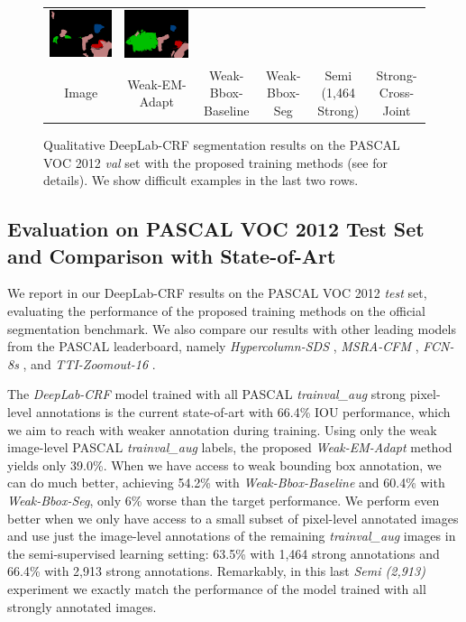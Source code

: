 \begin{figure}[!htbp]
{\begin{tabular}{c c c c c c}
    \includegraphics[height=0.11\linewidth]{fig/val_crf_vis/strongweak/2007_001175.png} &
    \includegraphics[height=0.11\linewidth]{fig/val_crf_vis/cocomix/2007_001175.png} \\
    {\footnotesize Image} & {\footnotesize Weak-EM-Adapt} & {\footnotesize
      Weak-Bbox-Baseline} & {\footnotesize Weak-Bbox-Seg} & {\footnotesize
      Semi (1,464 Strong)} & {\footnotesize Strong-Cross-Joint} \\
  \end{tabular}
  }
  \caption{Qualitative DeepLab-CRF segmentation results on the PASCAL
    VOC 2012 \textsl{val} set with the proposed training methods (see
     for details). We show difficult
    examples in the last two rows.}
  \label{fig:ValResults}
\end{figure}

\subsection{Evaluation on PASCAL VOC 2012 Test Set and Comparison with State-of-Art}

We report in  our DeepLab-CRF results on the
PASCAL VOC 2012 \textsl{test} set, evaluating the performance of the
proposed training methods on the official segmentation benchmark. We
also compare our results with other leading models from the PASCAL
leaderboard, namely \textsl{Hypercolumn-SDS}
\citep{hariharan2014hypercolumns}, \textsl{MSRA-CFM}
\citep{dai2014convolutional}, \textsl{FCN-8s} \citep{long2014fully},
and \textsl{TTI-Zoomout-16} \citep{mostajabi2014feedforward}.

The \textsl{DeepLab-CRF} model \citep{chen2014semantic} trained with
all PASCAL \textsl{trainval\_aug} strong pixel-level annotations is
the current state-of-art with 66.4\% IOU performance, which we aim to
reach with weaker annotation during training. Using only the weak
image-level PASCAL \textsl{trainval\_aug} labels, the proposed
\textsl{Weak-EM-Adapt} method yields only 39.0\%. When we have access
to weak bounding box annotation, we can do much better, achieving
54.2\% with \textsl{Weak-Bbox-Baseline} and 60.4\% with
\textsl{Weak-Bbox-Seg}, only 6\% worse than the target
performance. We perform even better when we only have access to a
small subset of pixel-level annotated images and use just the
image-level annotations of the remaining \textsl{trainval\_aug}
images in the semi-supervised learning setting: 63.5\% with 1,464
strong annotations and 66.4\% with 2,913 strong
annotations. Remarkably, in this last \textsl{Semi (2,913)} experiment
we exactly match the performance of the model trained with all
strongly annotated images.


